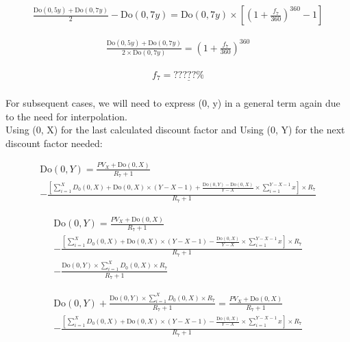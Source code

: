 \documentclass[12pt]{article}
\begin{document}
\begin{gather*}
\frac{\text{Do}(0, 5y) + \text{Do}(0, 7y)}{2} - \text{Do}(0, 7y)
= \text{Do}(0, 7y) \times \left[\left(1 + \frac{f_7}{360}\right)^{360} - 1\right]
\end{gather*}

\begin{gather*}
\frac{\text{Do}(0, 5y) + \text{Do}(0, 7y)}{2 \times  \text{Do}(0, 7y)}
= \left(1 + \frac{f_7}{360}\right)^{360} 
\end{gather*}

\begin{gather*}
f_7 = \underline{?????\%}\\
\end{gather*}

\noindent For subsequent cases, we will need to express (0, y) in a general term again due to the need for interpolation.\\

\noindent Using (0, X) for the last calculated discount factor and Using (0, Y) for the next discount factor needed:

\begin{gather*}
\text{Do}(0, Y) = 
\frac{PV_{X}^{} + \text{Do}(0,X)}{R_7 + 1}
\\
- \frac{\left[\sum_{i=1}^{X} D_0(0, X) + \text{Do}(0,X) \times (Y-X-1) + \frac{\text{Do}(0, Y)-\text{Do}(0, X)}{Y-X} \times \sum_{i=1}^{Y-X-1}x \right] \times R_7}{R_7 + 1}
\end{gather*}

\begin{gather*}
\text{Do}(0, Y) = 
\frac{PV_{X}^{} + \text{Do}(0,X)}{R_7 + 1}
\\
- \frac{\left[\sum_{i=1}^{X} D_0(0, X) + \text{Do}(0,X) \times (Y-X-1) - \frac{\text{Do}(0, X)}{Y-X} \times \sum_{i=1}^{Y-X-1}x \right] \times R_7}{R_7 + 1}
\\
-\frac{\text{Do}(0, Y) \times \sum_{i=1}^{X} D_0(0, X) \times R_7}{R_7 + 1}
\end{gather*}

\begin{gather*}
\text{Do}(0, Y) + \frac{\text{Do}(0, Y) \times \sum_{i=1}^{X} D_0(0, X) \times R_7}{R_7 + 1} = 
\frac{PV_{X}^{} + \text{Do}(0,X)}{R_7 + 1}
\\
- \frac{\left[\sum_{i=1}^{X} D_0(0, X) + \text{Do}(0,X) \times (Y-X-1) - \frac{\text{Do}(0, X)}{Y-X} \times \sum_{i=1}^{Y-X-1}x \right] \times R_7}{R_7 + 1}
\end{gather*}
\end{document}
